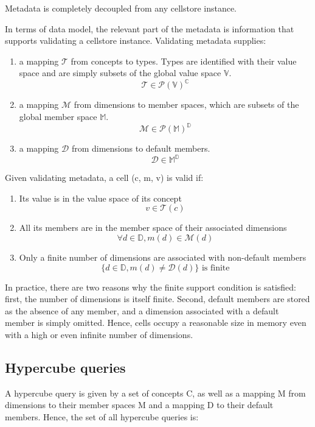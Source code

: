 \documentclass{acm_proc_article-sp}
\begin{document}
Metadata is completely decoupled from any cellstore instance.

In terms of data model, the relevant part of the metadata is information that supports validating a cellstore instance. Validating metadata supplies:

\begin{enumerate}
\item a mapping $\mathcal{T}$ from concepts to types. Types are identified with their value space and are simply subsets of the global value space $\mathbb{V}$.
$$\mathcal{T}\in\mathcal{P}(\mathbb{V})^\mathbb{C}$$

\item a mapping $\mathcal{M}$ from dimensions to member spaces, which are subsets of the global member space $\mathbb{M}$.
$$\mathcal{M}\in\mathcal{P}(\mathbb{M})^\mathbb{D}$$

\item a mapping $\mathcal{D}$ from dimensions to default members.
$$\mathcal{D}\in\mathbb{M}^\mathbb{D}$$
\end{enumerate}

Given validating metadata, a cell (c, m, v) is valid if:
\begin{enumerate}
\item Its value is in the value space of its concept
$$v\in\mathcal{T}(c)$$
\item All its members are in the member space of their associated dimensions $$\forall d\in\mathbb{D}, m(d)\in\mathcal{M}(d)$$
\item Only a finite number of dimensions are associated with non-default members
$$\{d\in\mathbb{D}, m(d)\neq\mathcal{D}(d)\} \text{ is finite}$$
\end{enumerate}

In practice, there are two reasons why the finite support condition is satisfied: first, the number of dimensions is itself finite. Second, default members are stored as the absence of any member, and a dimension associated with a default member is simply omitted. Hence, cells occupy a reasonable size in memory even with a high or even infinite number of dimensions.

\subsection{Hypercube queries}

A hypercube query is given by a set of concepts C, as well as a mapping M from dimensions to their member spaces M and a mapping D to their default members. Hence, the set of all hypercube queries is:
\end{document}
